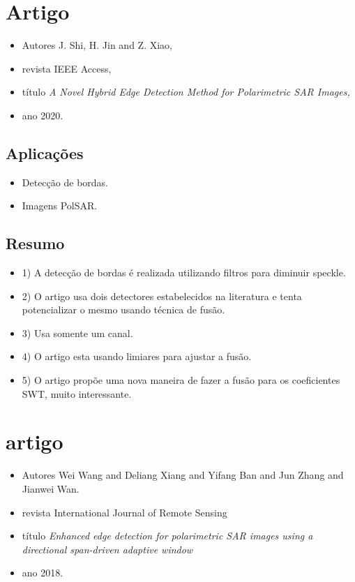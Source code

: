 \documentclass{article}
\begin{document}
\section{Artigo \cite{sjx}}
\begin{itemize}
\item Autores J. Shi, H. Jin and Z. Xiao,
\item revista IEEE Access,
\item título \textit{A Novel Hybrid Edge Detection Method for Polarimetric SAR Images,}
\item ano 2020.
\end{itemize}
\subsection{Aplicações}
\begin{itemize}
\item Detecção de bordas.
\item Imagens PolSAR.
\end{itemize}
\subsection{Resumo}
\begin{itemize}
\item 1) A detecção de bordas é realizada utilizando filtros para diminuir speckle.
\item 2) O artigo usa dois detectores estabelecidos na literatura e tenta potencializar o mesmo usando técnica de fusão. 
\item 3) Usa somente um canal.
\item 4) O artigo esta usando limiares para ajustar a fusão.
\item 5) O artigo propõe uma nova maneira de fazer a fusão para os coeficientes SWT, muito interessante. 
\end{itemize}
\section{artigo \cite{wxbzw}}
\begin{itemize}
\item Autores Wei Wang and Deliang Xiang and Yifang Ban and Jun Zhang and Jianwei Wan.
\item revista International Journal of Remote Sensing
\item título \textit{Enhanced edge detection for polarimetric SAR images using a directional span-driven adaptive window}
\item ano 2018.
\end{itemize}
\end{document}
